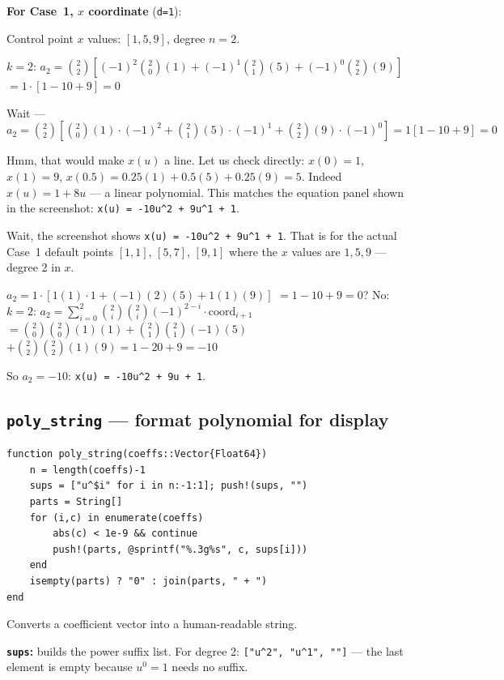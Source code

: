 \documentclass[12pt, a4paper]{article}
\newcommand{\cd}[1]{\texttt{#1}}
\begin{document}
\begin{examplebox}
\textbf{For Case~1, $x$ coordinate} (\cd{d=1}):

Control point $x$ values: $[1, 5, 9]$, degree $n=2$.

$k=2$: $a_2 = \binom{2}{2}[(-1)^2\binom{2}{0}(1) + (-1)^1\binom{2}{1}(5) + (-1)^0\binom{2}{2}(9)]$
$= 1 \cdot [1 - 10 + 9] = 0$

Wait --- $a_2 = \binom{2}{2}[\binom{2}{0}(1) \cdot(-1)^2 + \binom{2}{1}(5)\cdot(-1)^1 + \binom{2}{2}(9)\cdot(-1)^0] = 1[1-10+9] = 0$

Hmm, that would make $x(u)$ a line. Let us check directly:
$x(0) = 1$, $x(1) = 9$, $x(0.5) = 0.25(1)+0.5(5)+0.25(9) = 5$.
Indeed $x(u) = 1 + 8u$ --- a linear polynomial.
This matches the equation panel shown in the screenshot:
\cd{x(u) = -10u\^{}2 + 9u\^{}1 + 1}.

Wait, the screenshot shows \cd{x(u) = -10u\^{}2 + 9u\^{}1 + 1}.
That is for the actual Case~1 default points $[1,1]$, $[5,7]$, $[9,1]$
where the $x$ values are $1, 5, 9$ --- degree 2 in $x$.

$a_2 = 1 \cdot [1(1)\cdot 1 + (-1)(2)(5) + 1(1)(9)]$
$= 1 - 10 + 9 = 0$? No:
$k=2$: $a_2 = \sum_{i=0}^{2} \binom{2}{i}\binom{2}{i}(-1)^{2-i} \cdot \text{coord}_{i+1}$
$= \binom{2}{0}\binom{2}{0}(1)(1) + \binom{2}{1}\binom{2}{1}(-1)(5)$
$+ \binom{2}{2}\binom{2}{2}(1)(9) = 1 - 20 + 9 = -10$

So $a_2 = -10$: \cd{x(u) = -10u\^{}2 + 9u + 1}. \checkmark
\end{examplebox}

\subsection{\texttt{poly\_string} --- format polynomial for display}

\begin{verbatim}
function poly_string(coeffs::Vector{Float64})
    n = length(coeffs)-1
    sups = ["u^$i" for i in n:-1:1]; push!(sups, "")
    parts = String[]
    for (i,c) in enumerate(coeffs)
        abs(c) < 1e-9 && continue
        push!(parts, @sprintf("%.3g%s", c, sups[i]))
    end
    isempty(parts) ? "0" : join(parts, " + ")
end
\end{verbatim}

Converts a coefficient vector into a human-readable string.

\textbf{\cd{sups}:} builds the power suffix list.
For degree 2: \cd{["u\^{}2", "u\^{}1", ""]} ---
the last element is empty because $u^0 = 1$ needs no suffix.
\end{document}
